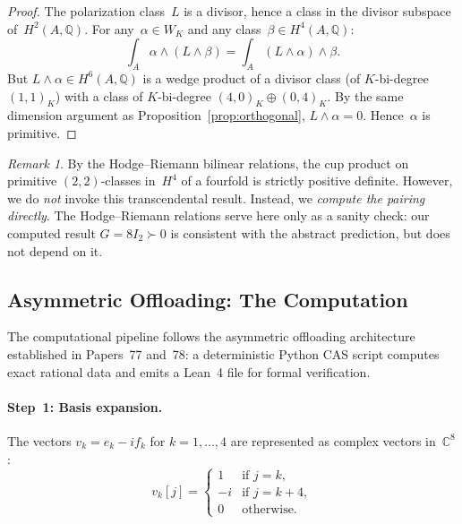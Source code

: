 \documentclass[11pt]{article}
\theoremstyle{plain}
\theoremstyle{definition}
\theoremstyle{remark}
\newtheorem{remark}[theorem]{Remark}
\newcommand{\Q}{\mathbb{Q}}
\newcommand{\C}{\mathbb{C}}
\begin{document}
\begin{proof}
The polarization class~$L$ is a divisor, hence a class in the divisor
subspace of~$H^2(A,\Q)$.  For any~$\alpha \in W_K$ and any
class~$\beta \in H^4(A,\Q)$:
\[
  \int_A \alpha \wedge (L \wedge \beta)
  = \int_A (L \wedge \alpha) \wedge \beta.
\]
But $L \wedge \alpha \in H^6(A,\Q)$ is a wedge product of a divisor class
(of $K$-bi-degree $(1,1)_K$) with a class of $K$-bi-degree
$(4,0)_K \oplus (0,4)_K$.  By the same dimension argument as
Proposition~\ref{prop:orthogonal}, $L \wedge \alpha = 0$.  Hence~$\alpha$
is primitive.
\end{proof}

\begin{remark}
By the Hodge--Riemann bilinear relations, the cup product on primitive
$(2,2)$-classes in~$H^4$ of a fourfold is strictly positive definite.
However, we do \emph{not} invoke this transcendental result.  Instead,
we \emph{compute the pairing directly}.  The Hodge--Riemann relations serve
here only as a sanity check: our computed result $G = 8I_2 \succ 0$ is
consistent with the abstract prediction, but does not depend on it.
\end{remark}

\subsection{Asymmetric Offloading: The Computation}
\label{sec:computation}

The computational pipeline follows the asymmetric offloading architecture
established in Papers~77 and~78: a deterministic Python CAS script computes
exact rational data and emits a Lean~4 file for formal verification.

\paragraph{Step~1: Basis expansion.}
The vectors $v_k = e_k - if_k$ for $k = 1,\ldots,4$ are represented as
complex vectors in~$\C^8$:
\[
  v_k[j] = \begin{cases}
    1 & \text{if } j = k, \\
    -i & \text{if } j = k+4, \\
    0 & \text{otherwise.}
  \end{cases}
\]
\end{document}
